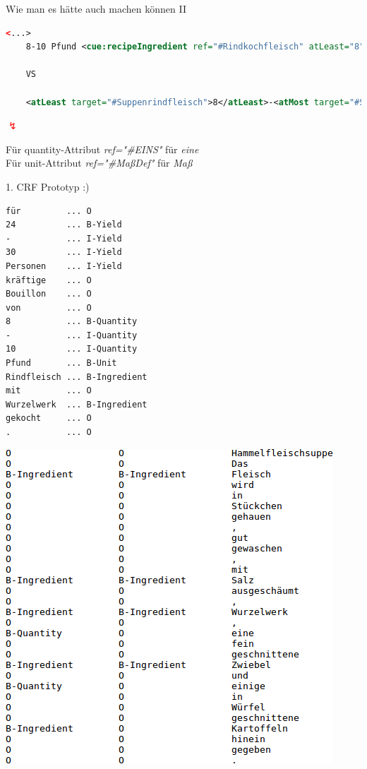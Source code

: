 \documentclass[12pt]{beamer}
\begin{document}
\begin{frame}[fragile]{Wie man es hätte auch machen können II}
	\begin{lstlisting}[language=XML]
	<...>
	8-10 Pfund <cue:recipeIngredient ref="#Rindkochfleisch" atLeast="8" atMost="10" unit="Pfund">Rindfleisch</cue:recipeIngredient>
	
	VS
	
	<atLeast target="#Suppenrindfleisch">8</atLeast>-<atMost target="#Suppenrindfleisch">10</atMost> <unit target="#Suppenrindfleisch">Pfund</unit> <recipeIngredient ref="#Suppenrindfleisch">Rindfleisch</recipeIngredient>
	\end{lstlisting}
	
	\begin{center}
		\textcolor{red}{\Large{$\lightning$}}
	\end{center}
	Für quantity-Attribut \textit{ref="\#EINS"} für \textit{eine} \\
	Für unit-Attribut \textit{ref="\#MaßDef"} für \textit{Maß}
\end{frame}


\begin{frame}[fragile]{1. CRF Prototyp :)}
	\vspace{-0.7em}\begin{lstlisting}
für			...	O
24			... B-Yield
-			... I-Yield
30			... I-Yield
Personen	...	I-Yield
kräftige	... O
Bouillon	... O
von			...	O
8			...	B-Quantity
-			...	I-Quantity
10			...	I-Quantity
Pfund		...	B-Unit
Rindfleisch	... B-Ingredient
mit			...	O
Wurzelwerk	...	B-Ingredient
gekocht		...	O
.			...	O
	\end{lstlisting}
\end{frame}	

\begin{frame}
	\includegraphics[scale=0.9]{Images/crfPrototypTagging}
\end{frame}
\end{document}
